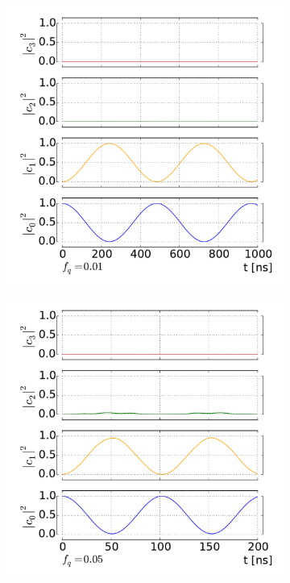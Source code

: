 \documentclass[12pt]{report}
\numberwithin{equation}{section}
\begin{document}
\begin{figure}[h!]
\centering
\begin{subfigure}[t]{0.45\textwidth}
\includegraphics[width=\textwidth]{tr_weak_dr}
\end{subfigure}
\begin{subfigure}[t]{0.45\textwidth}
\includegraphics[width=\textwidth]{tr_int_dr}
\end{subfigure}


\end{figure}
\end{document}
